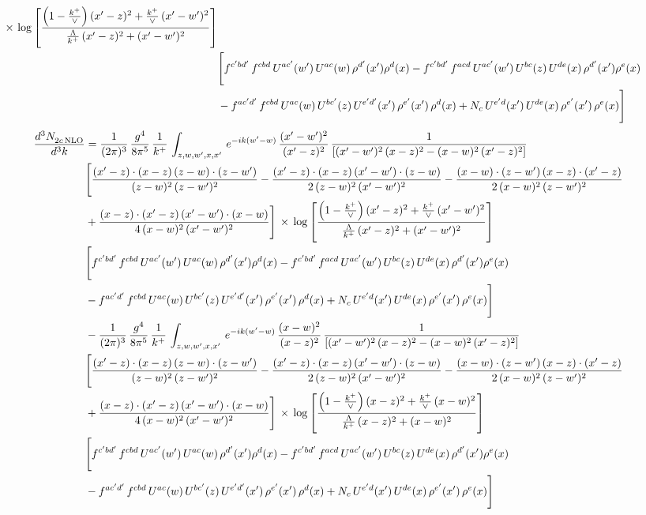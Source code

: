 \documentclass[9pt]{article}
\numberwithin{equation}{section}
\begin{document}
\begin{align}
\times\,\log{\left[\frac{\left(1-\frac{k^{+}}{\vee}\right)(x'-z)^{2}+\frac{k^{+}}{\vee}\,(x'-w')^{2}}{\frac{\Lambda}{k^{+}}\,(x'-z)^{2}+(x'-w')^{2}}\right]} \notag \\ & \Bigg[f^{c'bd'}\,f^{cbd}\, U^{ac'}(w')\,U^{ac}(w)\,\rho^{d'}(x')\rho^{d}(x)- f^{c'bd'}\,f^{acd}\,U^{ac'}(w')\,U^{bc}(z)\,U^{de}(x)\,\rho^{d'}(x')\rho^{e}(x) \notag \\ & -f^{ac'd'}\,f^{cbd}\,U^{ac}(w)\,U^{bc'}(z)\,U^{e'd'}(x')\,\rho^{e'}(x')\,\rho^{d}(x) +N_{c}\,U^{e'd}(x')\,U^{de}(x)\,\rho^{e'}(x')\,\rho^{e}(x)\Bigg]
\end{align}
\begin{align}
    \frac{d^{3}N_{2c\,\rm NLO}^{\rm}}{d^{3}k}  & = \frac{1}{(2\pi)^{3}}\, \frac{g^{4}}{8\pi^{5}}\,\frac{1}{k^{+}}\,\int_{z,w,w^{\prime},x,x'}\, e^{-ik(w^{\prime}-w)}\,\frac{(x'-w')^{2}}{(x'-z)^{2}}\, \frac{1}{\left[(x'-w')^{2}\, (x-z)^{2} - (x-w)^{2}\, (x'-z)^{2}\right]} \notag \\ & \Bigg[\frac{(x'-z)\cdot (x-z)\, (z-w)\cdot (z-w')}{(z-w)^{2}\, (z-w')^{2}}-\frac{(x'-z)\cdot (x-z)\, (x'-w')\cdot (z-w)}{2\, (z-w)^{2}\, (x'-w')^{2}} -\frac{(x-w)\cdot (z-w')\, (x-z)\cdot (x'-z)}{2\, (x-w)^{2}\, (z-w')^{2}}\notag \\ & +\frac{(x-z)\cdot (x'-z)\, (x'-w')\cdot (x-w)}{4\, (x-w)^{2}\, (x'-w')^{2}}\Bigg]\,\times\, \log{\left[\frac{\left(1-\frac{k^{+}}{\vee}\right)(x'-z)^{2}+\frac{k^{+}}{\vee}\,(x'-w')^{2}}{\frac{\Lambda}{k^{+}}\,(x'-z)^{2}+(x'-w')^{2}}\right]} \notag \\ &  \Bigg[f^{c'bd'}\,f^{cbd}\, U^{ac'}(w')\,U^{ac}(w)\,\rho^{d'}(x')\rho^{d}(x)- f^{c'bd'}\,f^{acd}\,U^{ac'}(w')\,U^{bc}(z)\,U^{de}(x)\,\rho^{d'}(x')\rho^{e}(x) \notag \\ & -f^{ac'd'}\,f^{cbd}\,U^{ac}(w)\,U^{bc'}(z)\,U^{e'd'}(x')\,\rho^{e'}(x')\,\rho^{d}(x) +N_{c}\,U^{e'd}(x')\,U^{de}(x)\,\rho^{e'}(x')\,\rho^{e}(x)\Bigg]\notag \\ & -\frac{1}{(2\pi)^{3}}\, \frac{g^{4}}{8\pi^{5}}\,\frac{1}{k^{+}}\,\int_{z,w,w^{\prime},x,x'}\, e^{-ik(w^{\prime}-w)}\,\frac{(x-w)^{2}}{(x-z)^{2}}\, \frac{1}{\left[(x'-w')^{2}\, (x-z)^{2} - (x-w)^{2}\, (x'-z)^{2}\right]} \notag \\ & \Bigg[\frac{(x'-z)\cdot (x-z)\, (z-w)\cdot (z-w')}{(z-w)^{2}\, (z-w')^{2}}-\frac{(x'-z)\cdot (x-z)\, (x'-w')\cdot (z-w)}{2\, (z-w)^{2}\, (x'-w')^{2}} -\frac{(x-w)\cdot (z-w')\, (x-z)\cdot (x'-z)}{2\, (x-w)^{2}\, (z-w')^{2}}\notag \\ & +\frac{(x-z)\cdot (x'-z)\, (x'-w')\cdot (x-w)}{4\, (x-w)^{2}\, (x'-w')^{2}}\Bigg]\,\times\, \log{\left[\frac{\left(1-\frac{k^{+}}{\vee}\right)(x-z)^{2}+\frac{k^{+}}{\vee}\,(x-w)^{2}}{\frac{\Lambda}{k^{+}}\,(x-z)^{2}+(x-w)^{2}}\right]} \notag \\ &  \Bigg[f^{c'bd'}\,f^{cbd}\, U^{ac'}(w')\,U^{ac}(w)\,\rho^{d'}(x')\rho^{d}(x)- f^{c'bd'}\,f^{acd}\,U^{ac'}(w')\,U^{bc}(z)\,U^{de}(x)\,\rho^{d'}(x')\rho^{e}(x) \notag \\ & -f^{ac'd'}\,f^{cbd}\,U^{ac}(w)\,U^{bc'}(z)\,U^{e'd'}(x')\,\rho^{e'}(x')\,\rho^{d}(x) +N_{c}\,U^{e'd}(x')\,U^{de}(x)\,\rho^{e'}(x')\,\rho^{e}(x)\Bigg]
\end{align}
\end{document}
